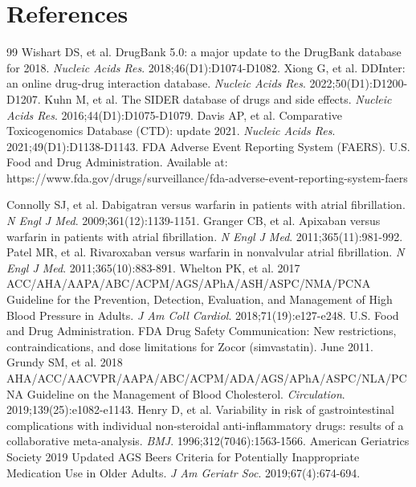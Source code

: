 \documentclass[11pt,a4paper]{article}
\begin{document}
\section*{References}


\begin{thebibliography}{99}
 Wishart DS, et al. DrugBank 5.0: a major update to the DrugBank database for 2018. \textit{Nucleic Acids Res}. 2018;46(D1):D1074-D1082.
 Xiong G, et al. DDInter: an online drug-drug interaction database. \textit{Nucleic Acids Res}. 2022;50(D1):D1200-D1207.
 Kuhn M, et al. The SIDER database of drugs and side effects. \textit{Nucleic Acids Res}. 2016;44(D1):D1075-D1079.
 Davis AP, et al. Comparative Toxicogenomics Database (CTD): update 2021. \textit{Nucleic Acids Res}. 2021;49(D1):D1138-D1143.
 FDA Adverse Event Reporting System (FAERS). U.S. Food and Drug Administration. Available at: https://www.fda.gov/drugs/surveillance/fda-adverse-event-reporting-system-faers

 Connolly SJ, et al. Dabigatran versus warfarin in patients with atrial fibrillation. \textit{N Engl J Med}. 2009;361(12):1139-1151.
 Granger CB, et al. Apixaban versus warfarin in patients with atrial fibrillation. \textit{N Engl J Med}. 2011;365(11):981-992.
 Patel MR, et al. Rivaroxaban versus warfarin in nonvalvular atrial fibrillation. \textit{N Engl J Med}. 2011;365(10):883-891.
 Whelton PK, et al. 2017 ACC/AHA/AAPA/ABC/ACPM/AGS/APhA/ASH/ASPC/NMA/PCNA Guideline for the Prevention, Detection, Evaluation, and Management of High Blood Pressure in Adults. \textit{J Am Coll Cardiol}. 2018;71(19):e127-e248.
 U.S. Food and Drug Administration. FDA Drug Safety Communication: New restrictions, contraindications, and dose limitations for Zocor (simvastatin). June 2011.
 Grundy SM, et al. 2018 AHA/ACC/AACVPR/AAPA/ABC/ACPM/ADA/AGS/APhA/ASPC/NLA/PCNA Guideline on the Management of Blood Cholesterol. \textit{Circulation}. 2019;139(25):e1082-e1143.
 Henry D, et al. Variability in risk of gastrointestinal complications with individual non-steroidal anti-inflammatory drugs: results of a collaborative meta-analysis. \textit{BMJ}. 1996;312(7046):1563-1566.
 American Geriatrics Society 2019 Updated AGS Beers Criteria for Potentially Inappropriate Medication Use in Older Adults. \textit{J Am Geriatr Soc}. 2019;67(4):674-694.
\end{thebibliography}
\end{document}

